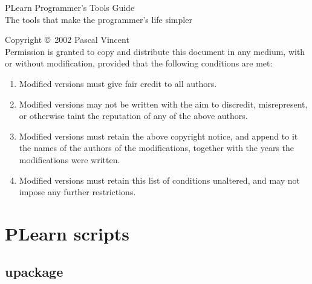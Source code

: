 \documentclass[11pt]{book}
\begin{document}
\thispagestyle{empty}

\thispagestyle{empty}
\begin{center}
{\Huge PLearn Programmer's Tools Guide}\\
\vspace{.5cm}
{\Large The tools that make the programmer's life simpler}\\ 
\vspace{6.5in}
\end{center}
\pagebreak

\vspace*{10cm}


{\small

Copyright \copyright\ 2002 Pascal Vincent \\

Permission is granted to copy and distribute this document in any medium,
with or without modification, provided that the following conditions are
met:

\begin{enumerate}
\item Modified versions must give fair credit to all authors.
\item Modified versions may not be written with the aim to discredit, misrepresent, or otherwise taint the
      reputation of any of the above authors.
\item Modified versions must retain the above copyright notice, and append to
   it the names of the authors of the modifications, together with the years the
   modifications were written.
\item Modified versions must retain this list of conditions unaltered, 
    and may not impose any further restrictions.
\end{enumerate}
}

\pagebreak

\tableofcontents

\cleardoublepage\pagebreak
{}


\chapter{PLearn scripts}

\section{upackage}
\end{document}
